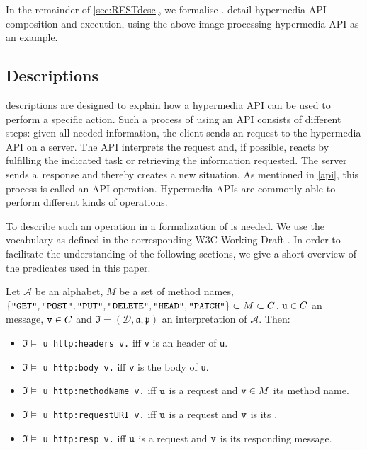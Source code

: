 In the remainder of \cref{sec:RESTdesc},
we formalise \restdesc.
 detail hypermedia API composition and execution,
using the above image processing hypermedia API as an example.




\subsection{\restdesc Descriptions}\label{rd}

\restdesc descriptions are designed to explain how a hypermedia API can be used to perform a specific action. 
Such a process of using an API consists of different steps:
given all needed information, the client sends an \http request to the hypermedia API on a server.
The API interprets the request and,
if possible, reacts by fulfilling the indicated task
or retrieving the information requested. The server sends a~response and thereby creates a new situation. As mentioned in \cref{api}, this process 
is called an API operation.
Hypermedia APIs are commonly able to perform different kinds of operations.

To describe such an operation in \nthree
a formalization of \http
is needed. 
We use the \rdf vocabulary as defined in the corresponding W3C Working Draft \cite{httprdf}.
In order to facilitate the understanding of the following sections, we give a short overview of the \http predicates used in this paper.

\begin{definition}
Let $\mathcal{A}$ be an \nthree alphabet,
$M$ be a set of \http method names,
$\{ \texttt{"GET"},\texttt{"POST"},\texttt{"PUT"},\linebreak[1]
\texttt{"DELETE"},\texttt{"HEAD"},\texttt{"PATCH"}\}\subset M \subset C$,
$\verb!u!\in C$ an \http message,
$\verb!v!\in C$
and $\mathfrak{I}=(\mathcal{D},\mathfrak{a,p})$ an interpretation of $\mathcal{A}$.
Then:


\begin{itemize}
 \item  $\mathfrak{I}\models$ \verb!u http:headers v.! iff \texttt{v} is an \http header of \verb!u!.
 \item $\mathfrak{I}\models$ \verb!u http:body v.! iff \verb!v! is the \http body of \verb!u!. 
  \item $\mathfrak{I}\models$ \verb!u http:methodName v.! iff $\verb!u!$ is a request and 
  $\verb!v!\in M$ its method name.
  \item $\mathfrak{I}\models$ \verb!u http:requestURI v.! iff $\verb!u!$ is a request and $\verb!v!$ is its \URL.
  \item $\mathfrak{I}\models$ \verb!u http:resp v.! iff $\verb!u!$ is a request and $\verb!v!$ is its responding \http message.
\end{itemize}
\end{definition}

